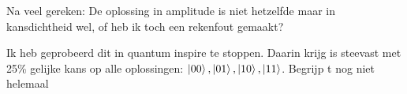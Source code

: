 \documentclass[../../main.tex]{subfiles}
\begin{document}
Na veel gereken: De oplossing in amplitude is niet hetzelfde maar in kansdichtheid wel, of heb ik toch een rekenfout gemaakt?


Ik heb geprobeerd dit in quantum inspire te stoppen. Daarin krijg is steevast met 25\% gelijke kans op alle oplossingen:
$\ket{00},\ket{01},\ket{10},\ket{11}$. Begrijp t nog niet helemaal
\end{document}
